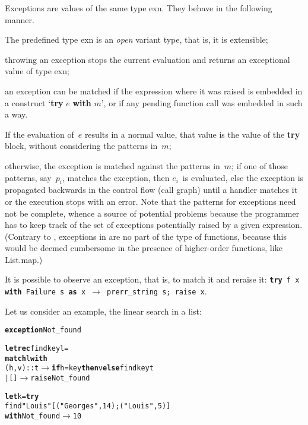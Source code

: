 Exceptions are values of the same type \textsf{exn}. They behave in
the following manner.
\begin{itemize*}

  \item The predefined type \textsf{exn} is an \emph{open} variant
    type, that is, it is extensible;

  \item throwing an exception stops the current evaluation and returns
    an exceptional value of type \textsf{exn};

  \item an exception can be matched if the expression where it was
    raised is embedded in a construct `\textsf{\textbf{try}
    $e$ \textbf{with} $m$}', or if any pending function call was
    embedded in such a way.
    \begin{itemize*}
 
      \item If the evaluation of~\(e\) results in a normal value, that
        value is the value of the \textsf{\textbf{try}} block, without
        considering the patterns in~\(m\);

      \item otherwise, the exception is matched against the patterns
        in~\(m\); if one of those patterns, say~\(p_i\), matches the
        exception, then \(e_i\)~is evaluated, else the exception is
        propagated backwards in the control flow (call graph) until a
        handler matches it or the execution stops with an error. Note
        that the patterns for exceptions need not be complete, whence
        a source of potential problems because the programmer has to
        keep track of the set of exceptions potentially raised by a
        given expression. (Contrary to \Java, exceptions in \OCaml are
        no part of the type of functions, because this would be deemed
        cumbersome in the presence of higher\hyp{}order functions,
        like \textsf{List.map}.)
    
    \end{itemize*}

  \item It is possible to observe an exception, that is, to match it
    and reraise it: \texttt{\textbf{try} f x \textbf{with} Failure
    s \textbf{as} x $\rightarrow$ prerr\_string s; raise x}.

\end{itemize*}
Let us consider an example, the linear search in a list:
\begin{alltt}
\textbf{exception} Not_found

\textbf{let rec} find key l =
  \textbf{match} l \textbf{with}
    (h,v)::t \(\rightarrow\) \textbf{if} h = key \textbf{then} v \textbf{else} find key t
  |       [] \(\rightarrow\) raise Not_found
  
\textbf{let} k = \textbf{try}
          find "Louis" [("Georges",14); ("Louis",5)]
        \textbf{with} Not_found \(\rightarrow\) 10
\end{alltt}

